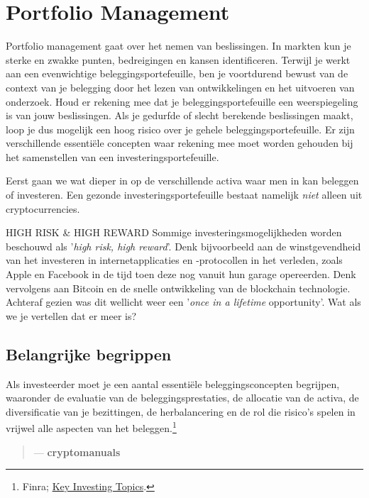 \chapter{Portfolio Management}
\label{ch:portfolio}

Portfolio management gaat over het nemen van beslissingen. In markten kun je sterke en zwakke punten, bedreigingen en kansen identificeren. Terwijl je werkt aan een evenwichtige beleggingsportefeuille, ben je voortdurend bewust van de context van je belegging door het lezen van ontwikkelingen en het uitvoeren van onderzoek. Houd er rekening mee dat je beleggingsportefeuille een weerspiegeling is van jouw beslissingen. Als je gedurfde of slecht berekende beslissingen maakt, loop je dus mogelijk een hoog risico over je gehele beleggingsportefeuille. Er zijn verschillende essenti\"ele concepten waar rekening mee moet worden gehouden bij het samenstellen van een investeringsportefeuille. 

Eerst gaan we wat dieper in op de verschillende activa waar men in kan beleggen of investeren. Een gezonde investeringsportefeuille bestaat namelijk \emph{niet} alleen uit cryptocurrencies.

    \bigskip
    \begin{cryptobox}{HIGH RISK \& HIGH REWARD}
    Sommige investeringsmogelijkheden worden beschouwd als '\emph{high risk, high reward}'. Denk bijvoorbeeld aan de winstgevendheid van het investeren in internetapplicaties en -protocollen in het verleden, zoals Apple en Facebook in de tijd toen deze nog vanuit hun garage opereerden. Denk vervolgens aan Bitcoin en de snelle ontwikkeling van de blockchain technologie. 
    \tcblower
    Achteraf gezien was dit wellicht weer een '\emph{once in a lifetime} opportunity'. Wat als we je vertellen dat er meer is?
    \end{cryptobox}


\section{Belangrijke begrippen}
Als investeerder moet je een aantal essenti\"ele beleggingsconcepten begrijpen, waaronder de evaluatie van de beleggingsprestaties, de allocatie van de activa, de diversificatie van je bezittingen, de herbalancering en de rol die risico's spelen in vrijwel alle aspecten van het beleggen.\footnote{Finra; \href{https://www.finra.org/investors/key-investing-concepts}{Key Investing Topics}.}

    \begin{quotation}
          \textit{}
          \begin{flushright}
            \small{--- \textbf{cryptomanuals}}
          \end{flushright}
    \end{quotation}

